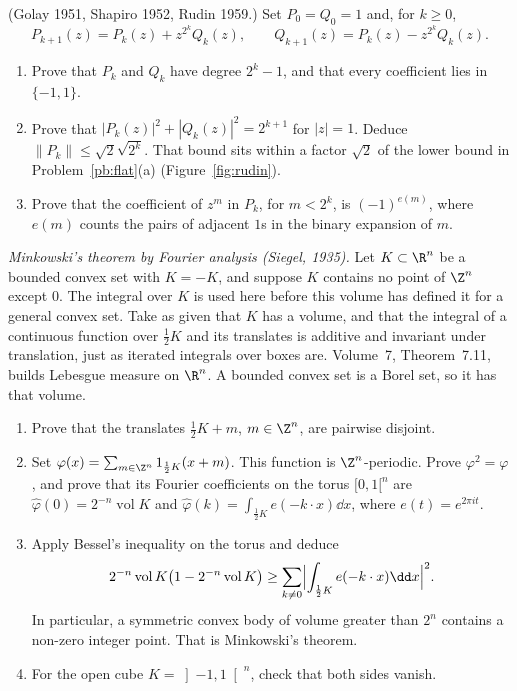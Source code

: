 \begin{exercise}[$\star\star$]\label{pb:rudin}
(Golay 1951, Shapiro 1952, Rudin 1959.) Set $P_0=Q_0=1$ and, for $k\ge0$,
\[
P_{k+1}(z)=P_k(z)+z^{2^k}Q_k(z),\qquad Q_{k+1}(z)=P_k(z)-z^{2^k}Q_k(z).
\]
\begin{enumerate}[label=(\alph*)]
\item Prove that $P_k$ and $Q_k$ have degree $2^k-1$, and that every coefficient lies in $\{-1,1\}$.
\item Prove that $|P_k(z)|^2+|Q_k(z)|^2=2^{k+1}$ for $|z|=1$. Deduce $\|P_k\|\le\sqrt2\sqrt{2^k}$. That bound sits within a factor $\sqrt2$ of the lower bound in Problem~\ref{pb:flat}(a) (Figure~\ref{fig:rudin}).
\item Prove that the coefficient of $z^m$ in $P_k$, for $m<2^k$, is $(-1)^{e(m)}$, where $e(m)$ counts the pairs of adjacent $1$s in the binary expansion of $m$.
\end{enumerate}
\end{exercise}

\begin{exercise}[$\star\star\star$]\label{pb:siegel}
\emph{Minkowski's theorem by Fourier analysis (Siegel, 1935).} Let $K\subset\R^n$ be a bounded convex set with $K=-K$, and suppose $K$ contains no point of $\Z^n$ except $0$. The integral over $K$ is used here before this volume has defined it for a general convex set. Take as given that $K$ has a volume, and that the integral of a continuous function over $\frac12K$ and its translates is additive and invariant under translation, just as iterated integrals over boxes are. Volume~7, Theorem~7.11, builds Lebesgue measure on $\R^n$. A bounded convex set is a Borel set, so it has that volume.
\begin{enumerate}[label=(\alph*)]
\item Prove that the translates $\frac12K+m$, $m\in\Z^n$, are pairwise disjoint.
\item Set $\varphi(x)=\sum_{m\in\Z^n}1_{\frac12K}(x+m)$. This function is $\Z^n$-periodic. Prove $\varphi^2=\varphi$, and prove that its Fourier coefficients on the torus $[0,1[^n$ are $\hat\varphi(0)=2^{-n}\operatorname{vol}K$ and $\hat\varphi(k)=\int_{\frac12K}e(-k\cdot x)\dd x$, where $e(t)=e^{2\pi it}$.
\item Apply Bessel's inequality on the torus and deduce
\[
2^{-n}\operatorname{vol}K\bigl(1-2^{-n}\operatorname{vol}K\bigr)\ge\sum_{k\ne0}\Bigl|\int_{\frac12K}e(-k\cdot x)\dd x\Bigr|^2.
\]
In particular, a symmetric convex body of volume greater than $2^n$ contains a non-zero integer point. That is Minkowski's theorem.
\item For the open cube $K=\left]-1,1\right[^n$, check that both sides vanish.
\end{enumerate}
\end{exercise}

